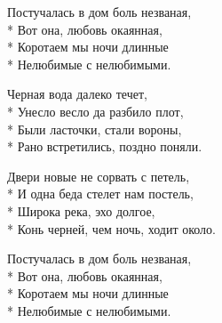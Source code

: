 \medskip

\begin{minipage}{\linewidth}
\hspace*{1.5em}Постучалась в дом боль незваная,\\*
\hspace*{1.5em}Вот она, любовь окаянная,\\*
\hspace*{1.5em}Коротаем мы ночи длинные\\*
\hspace*{1.5em}Нелюбимые с нелюбимыми.\\
\end{minipage}\par\medskip\nobreak

\medskip

\begin{minipage}{\linewidth}
Черная вода далеко течет,\\*
Унесло весло да разбило плот,\\*
Были ласточки, стали вороны,\\*
Рано встретились, поздно поняли.\\
\end{minipage}\par\medskip\nobreak

\medskip

\begin{minipage}{\linewidth}
Двери новые не сорвать с петель,\\*
И одна беда стелет нам постель,\\*
Широка река, эхо долгое,\\*
Конь черней, чем ночь, ходит около.\\
\end{minipage}\par\medskip\nobreak

\medskip

\begin{minipage}{\linewidth}
\hspace*{1.5em}Постучалась в дом боль незваная,\\*
\hspace*{1.5em}Вот она, любовь окаянная,\\*
\hspace*{1.5em}Коротаем мы ночи длинные\\*
\hspace*{1.5em}Нелюбимые с нелюбимыми.\\
\end{minipage}\par\medskip\nobreak

